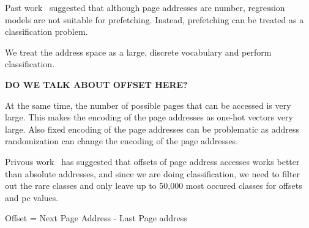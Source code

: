 Past work~\cite{LMAP} suggested that although page addresses are number, regression models are not suitable for prefetching. Instead, prefetching can be treated as a classification problem.

We treat the address space as a large, discrete vocabulary and perform classification. 

\textbf{DO WE TALK ABOUT OFFSET HERE?}

At the same time, the number of possible pages that can be accessed is very large. This makes the encoding of the page addresses as one-hot vectors very large. Also fixed encoding of the page addresses can be problematic as address randomization can change the encoding of the page addresses.

Privous work~\cite{LMAP} has suggested that offsets of page address accesses works better than absolute addresses, and since we are doing classification, we need to filter out the rare classes and only leave up to 50,000 most occured classes for offsets and pc values.

\begin{definition}
    {Offset} = {Next Page Address} - {Last Page address}
\end{definition}


    



